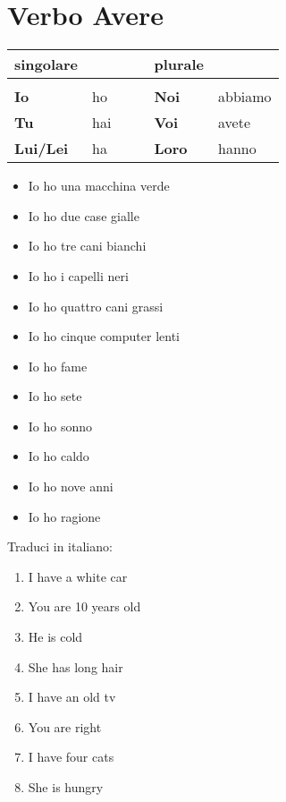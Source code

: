 \documentclass[letter,11pt]{article}
\newcommand{\myCode}[1]{\colorbox{gray!30}{#1}}
\begin{document}
\section*{Verbo Avere}
\vskip 0.2in

\begin{tabular}{ |p{2cm}| p{2cm}| p{0.2cm}| p{0.2cm}| p{2cm}| p{2cm}| }
     singolare &  &  &  & plurale &  \\
    \hline
    \hline
     &  &  &  &  &  \\ \hline
    {\bf Io} & ho   &  &  & {\bf Noi}  & abbiamo \\ \hline
    {\bf Tu} & hai  &  &  & {\bf Voi}  & avete \\ \hline
    {\bf Lui/Lei} & ha &  & & {\bf Loro} & hanno  \\ \hline
    \hline
    \end{tabular}

\hspace{5pt}

\begin{multicols}{2}
\begin{itemize}
    \item Io ho una macchina verde
    \item Io ho due case gialle
    \item Io ho tre cani bianchi
    \item Io ho i capelli neri
    \item Io ho quattro cani grassi
    \item Io ho cinque computer lenti

    \item Io ho fame
    \item Io ho sete
    \item Io ho sonno
    \item Io ho caldo
    \item Io ho nove anni
    \item Io ho ragione
\end{itemize}
\end{multicols}


\myCode{Traduci in italiano: }

\begin{multicols}{2}
\begin{enumerate}
    \item I have a white car
    \item You are 10 years old
    \item He is cold
    \item She has long hair
    \item I have an old tv
    \item You are right
    \item I have four cats
    \item She is hungry
\end{enumerate}
\end{multicols}
\end{document}
